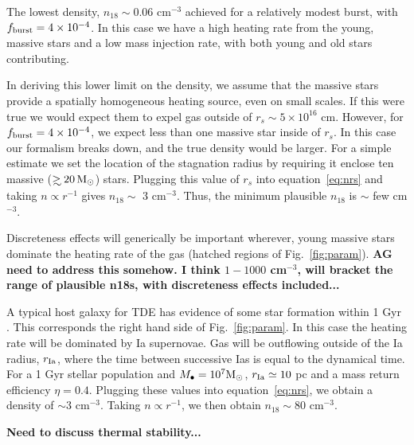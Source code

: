 \documentclass[usenatbib,fleqn]{mnras}
\newcommand\gsim{\mathrel{\rlap{\lower4pt\hbox{\hskip1pt$\sim$}}
    \raise1pt\hbox{$>$}}}
\newcommand{\Mbh}[1][]{M_{\bullet#1}}
\newcommand{\Msun}{{\rm M_\odot}}
\begin{document}
The lowest density, $n_{18}\sim 0.06$ cm$^{-3}$ achieved for a
relatively modest burst, with $f_{\rm burst}=4\times 10^{-4}$. In this
case we have a high heating rate from the young, massive stars and a
low mass injection rate, with both young and old stars contributing.

In deriving this lower limit on the density, we assume that the massive
stars provide a spatially homogeneous heating source, even on small
scales. If this were true we would expect them to expel
gas outside of $r_s \sim 5\times 10^{16}$ cm. However, for $f_{\rm
  burst}=4\times 10^{-4}$, we expect less than one massive star inside of
$r_s$.  In this case our formalism breaks down, and the true density
would be larger. For a simple estimate we set the location of the
stagnation radius by requiring it enclose ten massive ($\gsim 20
\, \Msun$) stars. Plugging this value of $r_s$ into equation~\eqref{eq:nrs}
and taking $n\propto r^{-1}$ gives $n_{18} \sim$ 3 cm$^{-3}$. Thus, the
minimum plausible $n_{18}$ is $\sim$ few cm$^{-3}$.

Discreteness effects will generically be important wherever, young
massive stars dominate the heating rate of the gas (hatched regions of
Fig.~\ref{fig:param}). {\bf AG need to address this somehow. I think
  $1-1000$ cm$^{-3}$, will bracket the range of plausible
  n18s, with discreteness effects included...}


A typical host galaxy for TDE has evidence of some star formation
within 1 Gyr \citep{French+2016}. This corresponds the right hand side
of Fig.~\ref{fig:param}. In this case the heating rate will be
dominated by Ia supernovae. Gas will be outflowing outside of the Ia
radius, $r_{\rm Ia}$, where the time between successive Ias is equal to
the dynamical time. For a 1 Gyr stellar population and $\Mbh=10^7
\Msun$, $r_{\rm Ia}\simeq 10$ pc and a mass return efficiency
$\eta=0.4$. Plugging these values into equation~\eqref{eq:nrs}, we obtain a
density of $\sim 3$ cm$^{-3}$. Taking $n\propto r^{-1}$, we then
obtain $n_{18}\sim 80$ cm$^{-3}$.

{\bf Need to discuss thermal stability...}


\end{document}
